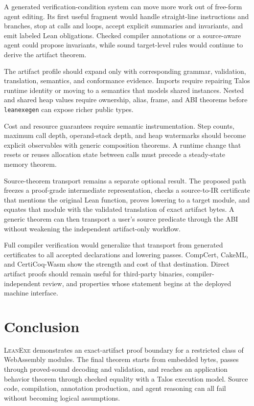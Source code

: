 \documentclass[11pt]{article}
\newcommand{\leanexe}{\textsc{LeanExe}}
\newcommand{\leanexegen}{\texttt{leanexegen}}
\begin{document}
A generated verification-condition system can move more work out of free-form agent editing.  Its first useful fragment would handle straight-line instructions and branches, stop at calls and loops, accept explicit summaries and invariants, and emit labeled Lean obligations.  Checked compiler annotations or a source-aware agent could propose invariants, while sound target-level rules would continue to derive the artifact theorem.

The artifact profile should expand only with corresponding grammar, validation, translation, semantics, and conformance evidence.  Imports require repairing Talos runtime identity or moving to a semantics that models shared instances.  Nested and shared heap values require ownership, alias, frame, and ABI theorems before \leanexegen{} can expose richer public types.

Cost and resource guarantees require semantic instrumentation.  Step counts, maximum call depth, operand-stack depth, and heap watermarks should become explicit observables with generic composition theorems.  A runtime change that resets or reuses allocation state between calls must precede a steady-state memory theorem.

Source-theorem transport remains a separate optional result.  The proposed path freezes a proof-grade intermediate representation, checks a source-to-IR certificate that mentions the original Lean function, proves lowering to a target module, and equates that module with the validated translation of exact artifact bytes.  A generic theorem can then transport a user's source predicate through the ABI without weakening the independent artifact-only workflow.

Full compiler verification would generalize that transport from generated certificates to all accepted declarations and lowering passes.  CompCert, CakeML, and CertiCoq-Wasm show the strength and cost of that destination.  Direct artifact proofs should remain useful for third-party binaries, compiler-independent review, and properties whose statement begins at the deployed machine interface.

\section{Conclusion}

\leanexe{} demonstrates an exact-artifact proof boundary for a restricted class of WebAssembly modules.  The final theorem starts from embedded bytes, passes through proved-sound decoding and validation, and reaches an application behavior theorem through checked equality with a Talos execution model.  Source code, compilation, annotation production, and agent reasoning can all fail without becoming logical assumptions.
\end{document}
